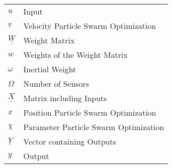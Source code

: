 \begin{tabular}{ll} 

$u$ & Input  \\
$\underline{v}$ & Velocity Particle Swarm Optimization  \\
$\underline{\underline{W}}$ & Weight Matrix  \\
$w$ & Weights of the Weight Matrix  \\
$\omega$ & Inertial Weight  \\
$\Omega$ & Number of Sensors  \\
$\underline{\underline{X}}$ & Matrix including Inputs  \\
$x$ & Position Particle Swarm Optimization  \\
$\chi$ & Parameter Particle Swarm Optimization  \\
$\underline{Y}$ & Vector containing Outputs  \\
$y$ & Output  \\
\end{tabular}
\label{tab:einflusparameter}






 
